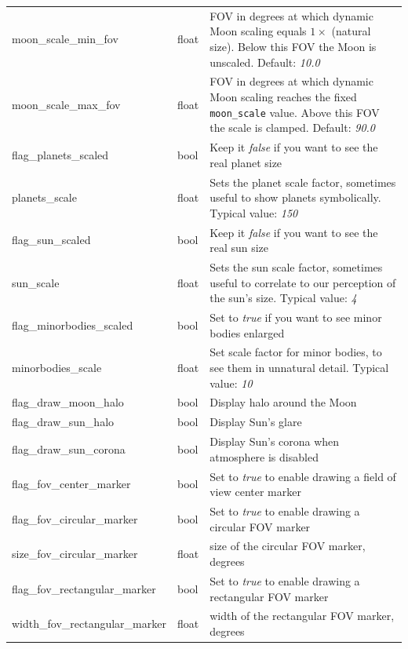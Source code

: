 \begin{longtable}{l|l|p{77mm}}
moon\_scale\_min\_fov         & float & FOV in degrees at which dynamic Moon scaling equals $1\times$
                               (natural size). Below this FOV the Moon is unscaled. Default: \emph{10.0}\\%
moon\_scale\_max\_fov         & float & FOV in degrees at which dynamic Moon scaling reaches the fixed
                               \texttt{moon\_scale} value. Above this FOV the scale is clamped. Default: \emph{90.0}\\
flag\_planets\_scaled         & bool  & Keep it \emph{false} if you want to see the real planet size \\%
planets\_scale                & float & Sets the planet scale factor, sometimes useful to show planets symbolically. Typical value: \emph{150}\\
flag\_sun\_scaled             & bool  & Keep it \emph{false} if you want to see the real sun size \\%
sun\_scale                    & float & Sets the sun scale factor, sometimes useful to correlate to our perception of the sun's size. Typical value: \emph{4}\\
flag\_minorbodies\_scaled     & bool  & Set to \emph{true} if you want to see minor bodies enlarged \\
minorbodies\_scale            & float & Set scale factor for minor bodies, to see them in unnatural detail. Typical value: \emph{10}\\
\midrule
flag\_draw\_moon\_halo           & bool  & Display halo around the Moon\\
flag\_draw\_sun\_halo            & bool  & Display Sun's glare\\
flag\_draw\_sun\_corona          & bool  & Display Sun's corona when atmosphere is disabled\\
\midrule
flag\_fov\_center\_marker        & bool  & Set to \emph{true} to enable drawing a field of view center marker \\
flag\_fov\_circular\_marker      & bool  & Set to \emph{true} to enable drawing a circular FOV marker \\
size\_fov\_circular\_marker      & float & size of the circular FOV marker, degrees \\
flag\_fov\_rectangular\_marker   & bool  & Set to \emph{true} to enable drawing a rectangular FOV marker \\
width\_fov\_rectangular\_marker  & float & width of the rectangular FOV marker, degrees \\

\end{longtable}

